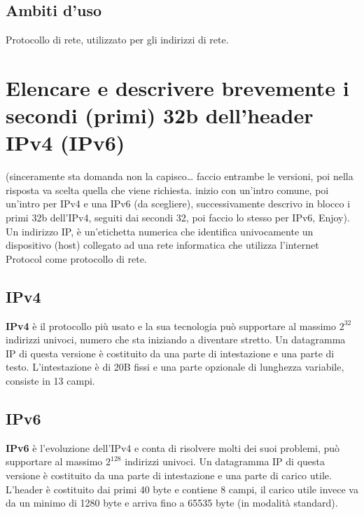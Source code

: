 \subsection{Ambiti d'uso}
Protocollo di rete, utilizzato per gli indirizzi di rete.

\section{Elencare e descrivere brevemente i secondi (primi) 32b dell'header IPv4 (IPv6)}
(sinceramente sta domanda non la capisco… faccio entrambe le versioni, poi nella risposta va scelta quella che viene richiesta. inizio con un'intro comune, poi un'intro per IPv4 e una IPv6 (da scegliere), successivamente descrivo in blocco i primi 32b dell'IPv4, seguiti dai secondi 32, poi faccio lo stesso per IPv6, Enjoy).\\

Un indirizzo IP, è un'etichetta numerica che identifica univocamente un dispositivo (host) collegato ad una rete informatica che utilizza l'internet Protocol come protocollo di rete.\\
\subsection{IPv4}
\textbf{IPv4} è il protocollo più usato e la sua tecnologia può supportare al massimo $2^32$ indirizzi univoci, numero che sta iniziando a diventare stretto.
Un datagramma IP di questa versione è costituito da una parte di intestazione e una parte di testo. L'intestazione è di 20B fissi e una parte opzionale di lunghezza variabile, consiste in 13 campi.\\
\subsection{IPv6}
\textbf{IPv6} è l'evoluzione dell'IPv4 e conta di risolvere molti dei suoi problemi, può supportare al massimo $2^128$ indirizzi univoci.
Un datagramma IP di questa versione è costituito da una parte di intestazione e una parte di carico utile. L'header è costituito dai primi 40 byte e contiene 8 campi, il carico utile invece va da un minimo di 1280 byte e arriva fino a 65535 byte (in modalità standard).

